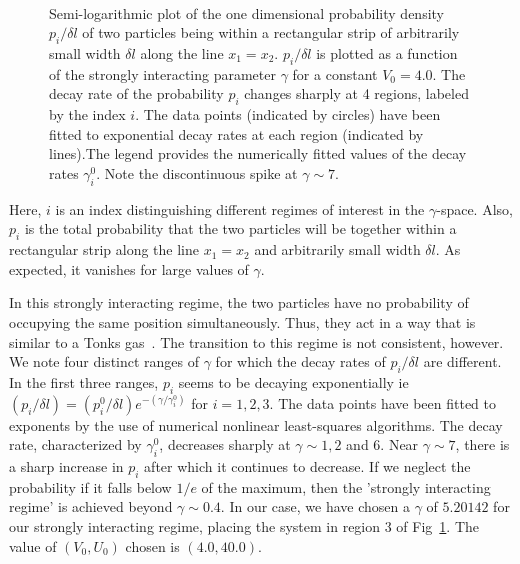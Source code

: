\documentclass{article}
\begin{document}
\begin{figure}
\hspace*{-0.5in}
\ 
\caption{Semi-logarithmic plot of the one dimensional probability density $p_i/{\delta l}$ of two particles being within a rectangular strip of arbitrarily small width $\delta l$ along the line $x_1=x_2$. $p_i/{\delta l}$ is plotted as a function of the strongly interacting parameter $\gamma$ for a constant $V_0=4.0$. The decay rate of the probability $p_i$ changes sharply at 4 regions, labeled by the index $i$. The data points (indicated by circles) have been fitted to exponential decay rates at each region (indicated by lines).The legend provides the numerically fitted values of the decay rates $\gamma^0_i$. Note the discontinuous spike at $\gamma\sim 7$.}
\label{fig:tonksparam }
\end{figure}
Here, $i$ is an index distinguishing different regimes of interest in the $\gamma$-space. Also, $p_i$ is the total probability that the two particles will be together within a rectangular strip along the line $x_1=x_2$ and arbitrarily small width $\delta l$. As expected, it vanishes for large values of $\gamma$.

In this strongly interacting regime, the two particles have no probability of occupying the same position simultaneously. Thus, they act in a way that is similar to a Tonks gas~\cite{tonks:gas}.  The transition to this regime is not consistent, however. We note four distinct ranges of $\gamma$ for which the decay rates of 
$p_i/{\delta l}$  are different. In the first three ranges, $p_i$ seems to be decaying exponentially ie $\left( p_i/{\delta l}\right)=\left( p^0_i/{\delta l} \right) e^{-(\gamma/\gamma^0_i)}$ for $i=1,2,3$. The data points have been fitted to exponents by the use of numerical nonlinear least-squares algorithms.
The decay rate, characterized by $ \gamma^0_i $, decreases sharply at $\gamma\sim 1, 2$ and $6$. Near $\gamma\sim 7$, there is a sharp increase in $p_i$ after which it continues to decrease. If we neglect the probability if it falls below $1/e$ of the maximum, then the 'strongly interacting regime' is achieved beyond $\gamma\sim 0.4$. In our case, we have chosen a $\gamma$ of $5.20142$ for our strongly interacting regime, placing the system in region $3$ of Fig~\ref{fig:tonksparam }. The value of $\left(V_0,U_0\right)$ chosen is $\left(4.0, 40.0\right)$.
\end{document}

